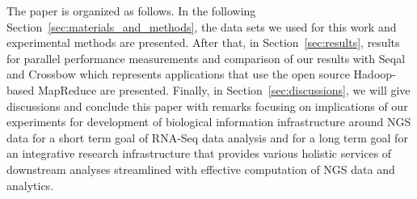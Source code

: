 \documentclass{acm_proc_article-sp}
\begin{document}


The paper is organized as follows. In the following
Section~\ref{sec:materials_and_methods}, the data sets we used for
this work and experimental methods are presented.  
After that, in Section~\ref{sec:results}, results for parallel performance
measurements and comparison of our results with Seqal and Crossbow
which represents applications that use the open source Hadoop-based
MapReduce\cite{hadoop-url, taylor2010,seal_2011_mapred,seal2011} are
presented.  Finally, in Section~\ref{sec:discussions}, we will give
discussions and conclude this paper with remarks focusing on
implications of our experiments for development of biological
information infrastructure around NGS data for a short term goal of
RNA-Seq data analysis and for a long term goal for an integrative
research infrastructure that provides various holistic services of
downstream analyses streamlined with effective computation of NGS data
and analytics.
\end{document}
